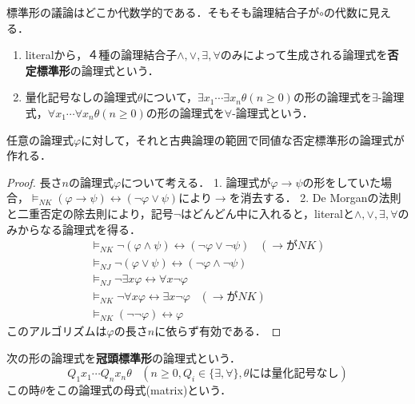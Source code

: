 \documentclass[uplatex, 12pt, dvipdfmx]{jsreport}
\begin{document}
標準形の議論はどこか代数学的である．そもそも論理結合子が$\circ$の代数に見える．

\begin{definition}\mbox{}
    \begin{enumerate}
        \item literalから，４種の論理結合子$\land,\lor,\exists,\forall$のみによって生成される論理式を\textbf{否定標準形}の論理式という．
        \item 量化記号なしの論理式$\theta$について，$\exists x_1\cdots\exists x_n\theta(n\ge 0)$の形の論理式を$\exists$-論理式，$\forall x_1\cdots\forall x_n\theta(n\ge 0)$の形の論理式を$\forall$-論理式という．
    \end{enumerate}
\end{definition}

\begin{lemma}\label{lemma-negation-normal-form}
    任意の論理式$\varphi$に対して，それと古典論理の範囲で同値な否定標準形の論理式が作れる．
\end{lemma}
\begin{proof}
    長さ$n$の論理式$\varphi$について考える．
    1. 論理式が$\varphi\to\psi$の形をしていた場合，$\vDash_{NK}(\varphi\to\psi)\leftrightarrow(\lnot\varphi\lor\psi)$により$\to$を消去する．
    2. De Morganの法則と二重否定の除去則により，記号$\lnot$はどんどん中に入れると，literalと$\land,\lor,\exists,\forall$のみからなる論理式を得る．
    \begin{align*}
        \vDash_{NK}\lnot(\varphi\land\psi)\leftrightarrow (\lnot\varphi\lor\lnot\psi)\;\;\;(\rightarrow がNK)\\
        \vDash_{NJ}\lnot(\varphi\lor\psi)\leftrightarrow (\lnot\varphi\land\lnot\psi)\\
        \vDash_{NJ}\lnot\exists x\varphi\leftrightarrow \forall x\lnot\varphi\\
        \vDash_{NK}\lnot\forall x\varphi\leftrightarrow \exists x\lnot\varphi\;\;\;(\rightarrow がNK)\\
        \vDash_{NK}(\lnot\lnot\varphi)\leftrightarrow\varphi
    \end{align*}
    このアルゴリズムは$\varphi$の長さ$n$に依らず有効である．
\end{proof}

\begin{definition}
    次の形の論理式を\textbf{冠頭標準形}の論理式という．
    \[ Q_1x_1\cdots Q_nx_n\theta\;\;\;(n\ge 0,Q_i\in\{\exists,\forall\},\theta には量化記号なし) \]
    この時$\theta$をこの論理式の母式(matrix)という．
\end{definition}
\end{document}

